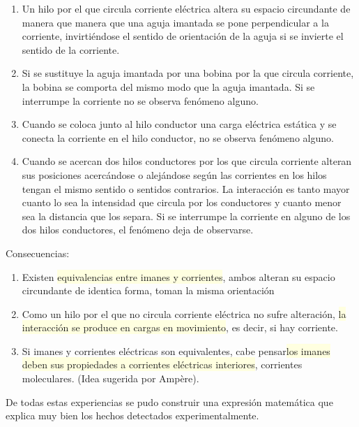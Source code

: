 \begin{enumerate}
\item Un hilo por el que circula corriente eléctrica altera su espacio circundante de manera que manera que una aguja imantada se pone perpendicular a la corriente, invirtiéndose el sentido de orientación de la aguja si se invierte el sentido de la corriente.
\item Si se sustituye la aguja imantada por una bobina por la que circula corriente, la bobina se comporta del mismo modo que la aguja imantada. Si se interrumpe la corriente no se observa fenómeno alguno.
\item Cuando se coloca junto al hilo conductor una carga eléctrica estática y se conecta la corriente en el hilo conductor, no se observa fenómeno alguno.
\item Cuando se acercan dos hilos conductores por los que circula corriente alteran sus posiciones acercándose o alejándose según las corrientes en los hilos tengan el mismo sentido o sentidos contrarios. La interacción es tanto mayor cuanto lo sea la intensidad que circula por los conductores y cuanto menor sea la distancia que los separa. Si se interrumpe la corriente en alguno de los dos hilos conductores, el fenómeno deja de observarse.
\end{enumerate}

Consecuencias:

\begin{enumerate}
\item Existen \colorbox{LightYellow}{equivalencias entre imanes y corrientes}, ambos alteran su espacio circundante de identica forma, toman la misma orientación
\item Como un hilo por el que no circula corriente eléctrica no sufre alteración, \colorbox{LightYellow}{la interacción se produce en cargas en movimiento}, es decir, si hay corriente.
\item Si imanes y corrientes eléctricas son equivalentes, cabe pensar\colorbox{LightYellow}{los imanes} \colorbox{LightYellow} {deben sus propiedades a corrientes eléctricas interiores}, corrientes moleculares. (Idea sugerida por Ampère).
\end{enumerate}

De todas estas experiencias se pudo construir una expresión matemática que explica muy bien los hechos detectados experimentalmente.

